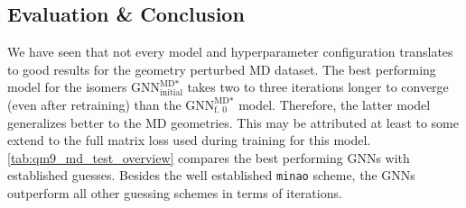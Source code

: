 \subsection{Evaluation \& Conclusion}
\label{sec:qm9_md_isomers_conclusion}
We have seen that not every model and hyperparameter configuration translates to good results for the geometry perturbed MD dataset. The best performing model for the isomers $\text{GNN}^{\text{MD*}}_\text{initial}$ takes two to three iterations longer to converge (even after retraining) than the $\text{GNN}^{\text{MD*}}_\text{f. 0}$ model. Therefore, the latter model generalizes better to the MD geometries. This may be attributed at least to some extend to the full matrix loss used during training for this model. \\
\autoref{tab:qm9_md_test_overview} compares the best performing GNNs with established guesses. Besides the well established \texttt{minao} scheme, the GNNs outperform all other guessing schemes in terms of iterations. 

